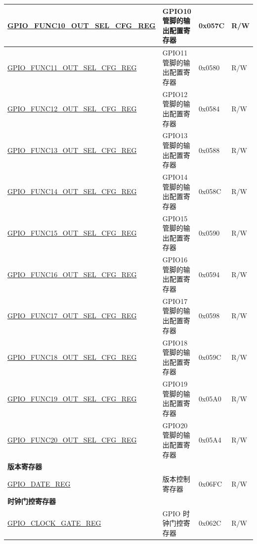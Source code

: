 \begin{longtable}{ | p{6cm} | p{6.7cm} | p{1.3cm} | p{1.5cm} | }
\hyperref[regdesc:GPIOFUNCNOUTSELCFGREG]{GPIO\_FUNC10\_OUT\_SEL\_CFG\_REG} & GPIO10 管脚的输出配置寄存器 & 0x057C & R/W \\ \hline
\hyperref[regdesc:GPIOFUNCNOUTSELCFGREG]{GPIO\_FUNC11\_OUT\_SEL\_CFG\_REG} & GPIO11 管脚的输出配置寄存器 & 0x0580 & R/W \\ \hline
\hyperref[regdesc:GPIOFUNCNOUTSELCFGREG]{GPIO\_FUNC12\_OUT\_SEL\_CFG\_REG} & GPIO12 管脚的输出配置寄存器 & 0x0584 & R/W \\ \hline
\hyperref[regdesc:GPIOFUNCNOUTSELCFGREG]{GPIO\_FUNC13\_OUT\_SEL\_CFG\_REG} & GPIO13 管脚的输出配置寄存器 & 0x0588 & R/W \\ \hline
\hyperref[regdesc:GPIOFUNCNOUTSELCFGREG]{GPIO\_FUNC14\_OUT\_SEL\_CFG\_REG} & GPIO14 管脚的输出配置寄存器 & 0x058C & R/W \\ \hline
\hyperref[regdesc:GPIOFUNCNOUTSELCFGREG]{GPIO\_FUNC15\_OUT\_SEL\_CFG\_REG} & GPIO15 管脚的输出配置寄存器 & 0x0590 & R/W \\ \hline
\hyperref[regdesc:GPIOFUNCNOUTSELCFGREG]{GPIO\_FUNC16\_OUT\_SEL\_CFG\_REG} & GPIO16 管脚的输出配置寄存器 & 0x0594 & R/W \\ \hline
\hyperref[regdesc:GPIOFUNCNOUTSELCFGREG]{GPIO\_FUNC17\_OUT\_SEL\_CFG\_REG} & GPIO17 管脚的输出配置寄存器 & 0x0598 & R/W \\ \hline
\hyperref[regdesc:GPIOFUNCNOUTSELCFGREG]{GPIO\_FUNC18\_OUT\_SEL\_CFG\_REG} & GPIO18 管脚的输出配置寄存器 & 0x059C & R/W \\ \hline
\hyperref[regdesc:GPIOFUNCNOUTSELCFGREG]{GPIO\_FUNC19\_OUT\_SEL\_CFG\_REG} & GPIO19 管脚的输出配置寄存器 & 0x05A0 & R/W \\ \hline
\hyperref[regdesc:GPIOFUNCNOUTSELCFGREG]{GPIO\_FUNC20\_OUT\_SEL\_CFG\_REG} & GPIO20 管脚的输出配置寄存器 & 0x05A4 & R/W \\ \hline

\multicolumn{4}{|l|}{\textbf{版本寄存器}} \\ \hline
\hyperref[regdesc:GPIOREGDATEREGREG]{GPIO\_DATE\_REG} & 版本控制寄存器 & 0x06FC & R/W \\ \hline

\multicolumn{4}{|l|}{\textbf{时钟门控寄存器}} \\ \hline
\hyperref[regdesc:GPIOCLOCKGATEREGREG]{GPIO\_CLOCK\_GATE\_REG} & GPIO 时钟门控寄存器 & 0x062C & R/W \\ \hline
\end{longtable}
